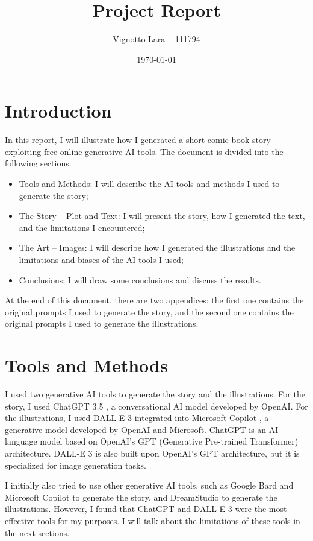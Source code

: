 \documentclass[a4paper,11pt]{article}
\title{\Huge Project Report}
\author{Vignotto Lara -- 111794}
\date{\today}
\begin{document}
\maketitle
\vspace{1cm}
\tableofcontents
\vspace{3cm}



\section{Introduction}
In this report, I will illustrate how I generated a short comic book story exploiting free online generative AI tools. The document is divided into the following sections:
\begin{itemize}
    \item Tools and Methods: I will describe the AI tools and methods I used to generate the story;
    \item The Story -- Plot and Text: I will present the story, how I generated the text, and the limitations I encountered;
    \item The Art -- Images: I will describe how I generated the illustrations and the limitations and biases of the AI tools I used;
    \item Conclusions: I will draw some conclusions and discuss the results.
\end{itemize}
At the end of this document, there are two appendices: the first one contains the original prompts I used to generate the story, and the second one contains the original prompts I used to generate the illustrations.



\section{Tools and Methods}
I used two generative AI tools to generate the story and the illustrations. For the story, I used ChatGPT 3.5 \cite{gpt}, a conversational AI model developed by OpenAI. For the illustrations, I used DALL-E 3 integrated into Microsoft Copilot \cite{copilot2023}, a generative model developed by OpenAI and Microsoft. 
ChatGPT is an AI language model based on OpenAI's GPT (Generative Pre-trained Transformer) architecture. DALL-E 3 is also built upon OpenAI's GPT architecture, but it is specialized for image generation tasks. 

I initially also tried to use other generative AI tools, such as Google Bard \cite{bard} and Microsoft Copilot to generate the story, and DreamStudio \cite{dreamstudio} to generate the illustrations. However, I found that ChatGPT and DALL-E 3 were the most effective tools for my purposes. I will talk about the limitations of these tools in the next sections.
\end{document}
